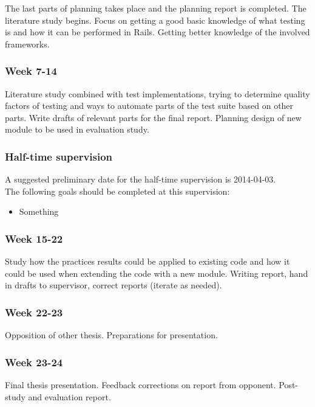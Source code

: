 The last parts of planning takes place and the planning report is
completed. The literature study begins. Focus on getting a good basic
knowledge of what testing is and how it can be performed in Rails.
Getting better knowledge of the involved frameworks.


\subsubsection{Week 7-14}

Literature study combined with test implementations, trying to determine
quality factors of testing and ways to automate parts of the test suite
based on other parts. Write drafts of relevant parts for the final
report. Planning design of new module to be used in evaluation study.


\subsubsection{Half-time supervision}

A suggested preliminary date for the half-time supervision is 2014-04-03.\\

The following goals should be completed at this supervision:
\begin{itemize}
  \item Something
\end{itemize}


\subsubsection{Week 15-22}

Study how the practices results could be applied to existing code and
how it could be used when extending the code with a new module. Writing
report, hand in drafts to supervisor, correct reports (iterate as
needed).


\subsubsection{Week 22-23}

Opposition of other thesis. Preparations for presentation.


\subsubsection{Week 23-24}

Final thesis presentation. Feedback corrections on report from opponent.
Post-study and evaluation report.
